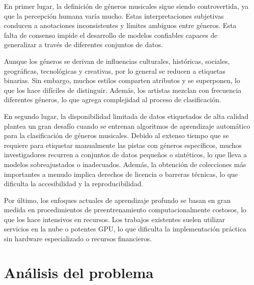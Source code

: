 \documentclass[colorinlistoftodos,twoside,twocolumn,10pt]{article} %
\begin{document}
En primer lugar, la definici\'on de g\'eneros musicales sigue siendo controvertida, ya que la percepci\'on humana var\'ia mucho. Estas interpretaciones subjetivas conducen a anotaciones inconsistentes  y l\'imites ambiguos entre g\'eneros. Esta falta de consenso impide el desarrollo de modelos confiables capaces de generalizar a trav\'es de diferentes conjuntos de datos.

Aunque los g\'eneros se derivan de influencias culturales, hist\'oricas, sociales, geogr\'aficas, tecnol\'ogicas y creativas, por lo general se reducen a etiquetas binarias. Sin embargo, muchos estilos comparten atributos y se superponen, lo que los hace dif\'iciles de distinguir. Adem\'as, los artistas mezclan con frecuencia diferentes g\'eneros, lo que agrega complejidad al proceso de clasificaci\'on.

En segundo lugar, la disponibilidad limitada de datos etiquetados de alta calidad plantea un gran desaf\'io cuando se entrenan algoritmos de aprendizaje autom\'atico para la clasificaci\'on de g\'eneros musicales. Debido al extenso tiempo que se requiere para etiquetar manualmente las pistas con g\'eneros espec\'ificos, muchos investigadores recurren a conjuntos de datos peque\~nos o sint\'eticos, lo que lleva a modelos sobreajustados o inadecuados. Adem\'as, la obtenci\'on de colecciones m\'as importantes a menudo implica derechos de licencia o barreras t\'ecnicas, lo que dificulta la accesibilidad y la reproducibilidad.

Por \'ultimo, los enfoques actuales de aprendizaje profundo se basan en gran medida en procedimientos de preentrenamiento computacionalmente costosos, lo que los hace intensivos en recursos. Los trabajos existentes suelen utilizar servicios en la nube o potentes GPU, lo que dificulta la implementaci\'on pr\'actica sin hardware especializado o recursos financieros. 
	  

\section {An\'alisis del problema}
\end{document}
